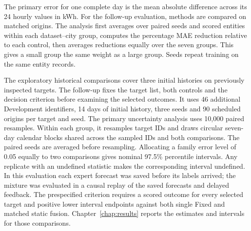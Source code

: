 The primary error for one complete day is the mean absolute difference across its 24 hourly values in kWh. For the follow-up evaluation, methods are compared on matched origins. The analysis first averages over paired seeds and scored entities within each dataset--city group, computes the percentage MAE reduction relative to each control, then averages reductions equally over the seven groups. This gives a small group the same weight as a large group. Seeds repeat training on the same entity records.

The exploratory historical comparisons cover three initial histories on previously inspected targets. The follow-up fixes the target list, both controls and the decision criterion before examining the selected outcomes. It uses 46 additional Development identifiers, 14 days of initial history, three seeds and 90 scheduled origins per target and seed. The primary uncertainty analysis uses 10,000 paired resamples. Within each group, it resamples target IDs and draws circular seven-day calendar blocks shared across the sampled IDs and both comparisons. The paired seeds are averaged before resampling. Allocating a family error level of 0.05 equally to two comparisons gives nominal 97.5\% percentile intervals. Any replicate with an undefined statistic makes the corresponding interval undefined. In this evaluation each expert forecast was saved before its labels arrived; the mixture was evaluated in a causal replay of the saved forecasts and delayed feedback. The prespecified criterion requires a scored outcome for every selected target and positive lower interval endpoints against both single Fixed and matched static fusion. Chapter~\ref{chap:results} reports the estimates and intervals for those comparisons.
